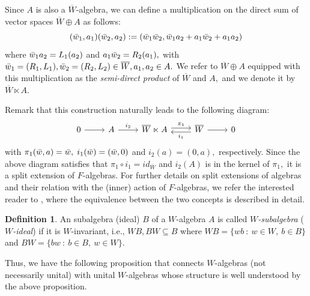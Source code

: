 \documentclass[reqno]{amsart}
\theoremstyle{definition}
\newtheorem{definition}[theorem]{Definition}
\numberwithin{equation}{section}
\numberwithin{theorem}{section}
\begin{document}
Since $A$ is also a $\overline{W}$-algebra, we can define a multiplication on the direct sum of vector spaces $\overline{W}\oplus A$ as follows:
\begin{equation*}
(\Bar{w}_1,a_1) (\Bar{w}_2,a_2) :=
(\Bar{w}_1\Bar{w}_2, 
\Bar{w}_1 a_2 + a_1 \Bar{w}_2 + a_1 a_2)
\end{equation*}
where  $\Bar{w}_1 a_2=L_1(a_2)$ and $ a_1 \Bar{w}_2=R_2(a_1),$ with $  \Bar{w}_1=(R_1,L_1), \Bar{w}_2=(R_2,L_2)\in \overline{W}, a_1,a_2\in A.$ We refer to $\overline{W}\oplus A$ equipped with this multiplication as the \emph{semi-direct product} of $\overline{W}$ and $A,$ and we denote it by $\overline{W} \ltimes A$. 

Remark that this construction naturally leads to the following diagram:
\begin{equation*}\label{split extension}
    \begin{tikzcd}
0 \arrow[r] & A \arrow[r, "i_2"] & \overline{W} \ltimes A \arrow[r, "\pi_1", shift left] & \overline{W} \arrow[r] \arrow[l, "i_1", shift left] & 0
\end{tikzcd}
\end{equation*}
with $\pi_1(\Bar{w},a)=\Bar{w},$ $i_1(\Bar{w})=(\Bar{w},0)$ and $i_2(a)=(0,a),$ respectively. Since the above diagram satisfies that $\pi_1 \circ i_1=id_{\overline{W}}$ and $i_2(A)$ is in the kernel of $\pi_1,$ it is a split extension of $F$-algebras. 
For further details on split extensions of algebras and their relation with the (inner) action of $F$-algebras, we refer the interested reader to \cite{BorceuxJanelizedKelly2005, Janelidze2022}, where the equivalence between the two concepts is described in detail.


\begin{definition}
An subalgebra (ideal) $B$ of a $W$-algebra $A$ is called \emph{$W$-subalgebra} (\emph{$W$-ideal}) if it is $W$-invariant, i.e., $WB, BW\subseteq B$ where 
$ WB=\{ wb \ : \ w\in W, \ b\in B\}$ and $BW=\{ bw \ : \  b\in B, \ w\in W\}.$
\end{definition}

Thus, we have the following proposition that connects $W$-algebras (not necessarily unital) with unital $W$-algebras whose structure is well understood by the above proposition. 
\end{document}
